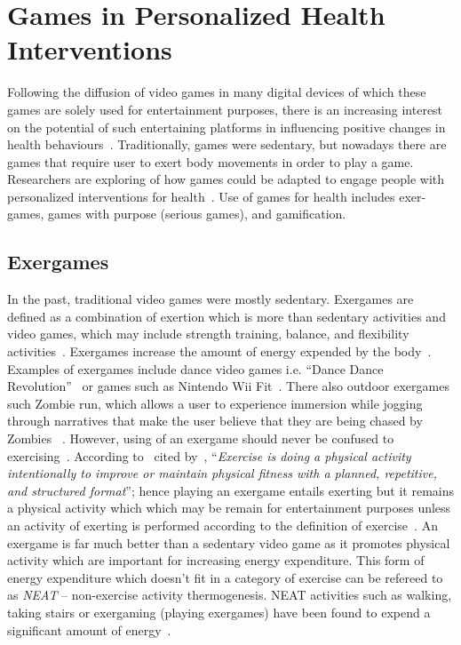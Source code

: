 \section{Games in Personalized Health Interventions}
Following the diffusion of video games in many digital devices of which these games are solely used for entertainment purposes, there is an increasing interest on the potential of such entertaining platforms in influencing positive changes in health behaviours~\citep{king2013gamification}. Traditionally, games were sedentary, but nowadays there are games that require user to exert body movements in order to play a game. Researchers are exploring of how games could be adapted to engage people with personalized interventions for health~\citep{mccallum2012gamification}. Use of games for health includes exer-games, games with purpose (serious games), and gamification.
\subsection{Exergames}
In the past, traditional video games were mostly sedentary. Exergames are defined as a combination of exertion which is more than sedentary activities and video games, which may include strength training, balance, and flexibility activities~\citep{oh2010defining}. Exergames increase the amount of energy expended by the body~\citep{graves2010physiological}. Examples of exergames include  dance video games i.e. ``Dance Dance Revolution''~\citep{lieberman2006dance} or games such as Nintendo Wii Fit~\citep{gobel2010serious}. There also outdoor exergames such Zombie run, which allows a user to experience immersion while jogging through narratives that make the user believe that they are being chased by Zombies ~\citep{southerton2013zombies}. However, using of an exergame should never be confused to exercising~\citep{oh2010defining}. According to~\cite[p. 126]{caspersen1985physical} cited by~\cite{oh2010defining}, ``\emph{Exercise is doing a physical activity intentionally to improve or maintain physical fitness with a planned, repetitive, and structured format}''; hence playing an exergame entails exerting but it remains a physical activity which which may be remain for entertainment purposes unless an activity of exerting is performed according to the definition of exercise~\citep{oh2010defining}. An exergame is far much better than a sedentary video game as it promotes physical activity which are important for increasing energy expenditure. This form of energy expenditure which doesn't fit in a category of exercise can be refereed to as \emph{NEAT} -- non-exercise activity thermogenesis. NEAT activities such as walking, taking stairs or exergaming (playing exergames) have been found to expend a significant amount of energy~\citep{fujiki2008neat}.


